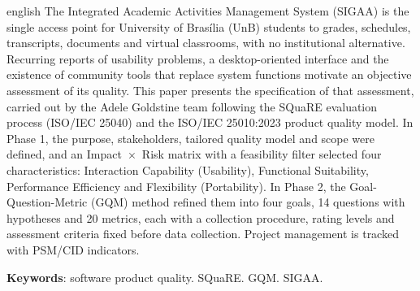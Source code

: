 \begin{resumo}[Abstract]
 \begin{otherlanguage*}{english}
The Integrated Academic Activities Management System (SIGAA) is the single access point for University of Brasília (UnB) students to grades, schedules, transcripts, documents and virtual classrooms, with no institutional alternative. Recurring reports of usability problems, a desktop-oriented interface and the existence of community tools that replace system functions motivate an objective assessment of its quality. This paper presents the specification of that assessment, carried out by the Adele Goldstine team following the SQuaRE evaluation process (ISO/IEC 25040) and the ISO/IEC 25010:2023 product quality model. In Phase 1, the purpose, stakeholders, tailored quality model and scope were defined, and an Impact~$\times$~Risk matrix with a feasibility filter selected four characteristics: Interaction Capability (Usability), Functional Suitability, Performance Efficiency and Flexibility (Portability). In Phase 2, the Goal-Question-Metric (GQM) method refined them into four goals, 14 questions with hypotheses and 20 metrics, each with a collection procedure, rating levels and assessment criteria fixed before data collection. Project management is tracked with PSM/CID indicators.

   \vspace{\onelineskip}

   \noindent
   \textbf{Keywords}: software product quality. SQuaRE. GQM. SIGAA.
 \end{otherlanguage*}
\end{resumo}
